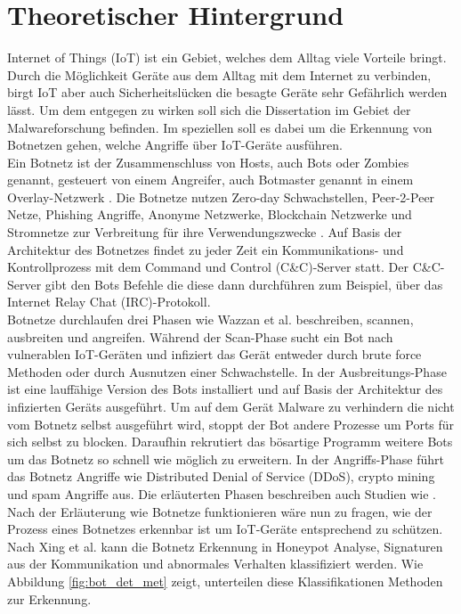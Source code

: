 \section{Theoretischer Hintergrund}
\label{sec:theory}

Internet of Things (IoT) ist ein Gebiet, welches dem Alltag viele Vorteile bringt. Durch die Möglichkeit
Geräte aus dem Alltag mit dem Internet zu verbinden, birgt IoT aber auch Sicherheitslücken die besagte Geräte sehr Gefährlich
werden lässt. Um dem entgegen zu wirken soll sich die Dissertation im Gebiet der Malwareforschung befinden. Im speziellen soll es dabei um 
die Erkennung von Botnetzen gehen, welche Angriffe über IoT-Geräte ausführen. \\ Ein Botnetz ist der Zusammenschluss von Hosts, auch Bots oder Zombies genannt, gesteuert von einem Angreifer, 
auch Botmaster genannt in einem Overlay-Netzwerk \cite{Xing2021SurveyOB}. Die Botnetze nutzen Zero-day Schwachstellen, Peer-2-Peer Netze, Phishing Angriffe, Anonyme Netzwerke,
Blockchain Netzwerke und Stromnetze zur Verbreitung für ihre Verwendungszwecke \cite{DBLP:conf/cycon/CasenoveM14,DBLP:conf/esorics/KurtECAU20}. Auf Basis der Architektur 
des Botnetzes findet zu jeder Zeit ein Kommunikations- und Kontrollprozess mit dem Command und Control (C\&C)-Server statt. Der C\&C-Server gibt den Bots Befehle die 
diese dann durchführen \cite{SCHILLER200729} zum Beispiel, über das Internet Relay Chat (IRC)-Protokoll. \\ Botnetze durchlaufen drei Phasen wie Wazzan et al. 
\cite{Wazzan2021InternetOT} beschreiben, scannen, ausbreiten und angreifen. Während der Scan-Phase sucht ein Bot nach vulnerablen IoT-Geräten und 
infiziert das Gerät entweder durch brute force Methoden oder durch Ausnutzen einer Schwachstelle.
In der Ausbreitungs-Phase ist eine lauffähige Version des Bots installiert und auf Basis der Architektur des infizierten Geräts ausgeführt.
Um auf dem Gerät Malware zu verhindern die nicht vom Botnetz selbst ausgeführt wird, stoppt der Bot andere Prozesse um Ports für sich selbst zu blocken. 
Daraufhin rekrutiert das bösartige Programm weitere Bots um das Botnetz so schnell wie möglich zu erweitern. In der Angriffs-Phase führt das Botnetz Angriffe wie Distributed Denial of 
Service (DDoS), crypto mining und spam Angriffe aus. Die erläuterten Phasen beschreiben auch Studien wie 
\cite{10.1007/978-3-030-33229-7_21, Alzahrani2020,DBLP:journals/computer/VlajicZ18,NGUYEN2020128}. \\ Nach der Erläuterung wie Botnetze funktionieren wäre nun zu fragen, wie der Prozess eines 
Botnetzes erkennbar ist um IoT-Geräte entsprechend zu schützen. Nach Xing et al. \cite{Xing2021SurveyOB} kann die Botnetz Erkennung in Honeypot Analyse, Signaturen aus der Kommunikation und 
abnormales Verhalten klassifiziert werden. Wie Abbildung \ref{fig:bot_det_met} zeigt, unterteilen diese Klassifikationen Methoden zur Erkennung. 

